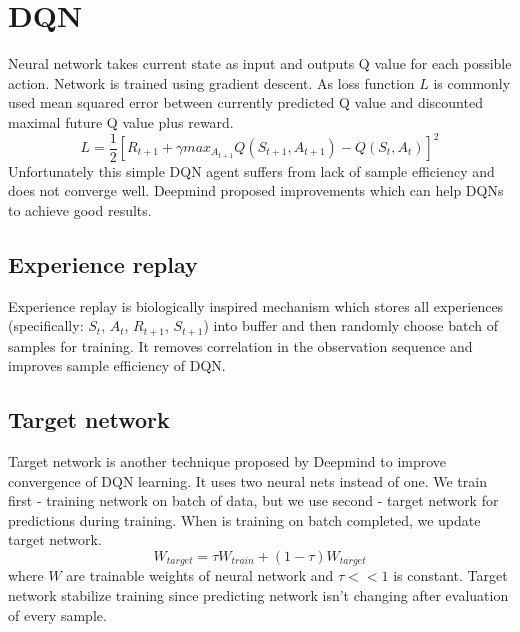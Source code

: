 \section{DQN}
Neural network takes current state as input and outputs Q value for each possible action. Network is trained using gradient descent. As loss function $L$ is commonly used mean squared error between currently predicted Q value and discounted maximal future Q value plus reward.
\begin{equation}
L = \frac{1}{2}[R_{t+1} + \gamma max_{A_{t+1}}Q(S_{t+1}, A_{t+1}) - Q(S_t, A_t)]^2
\end{equation}
Unfortunately this simple DQN agent suffers from lack of sample efficiency and does not converge well. Deepmind proposed improvements which can help DQNs to achieve good results.

\subsection{Experience replay}
Experience replay is biologically inspired mechanism which stores all experiences (specifically: $S_t$, $A_t$, $R_{t+1}$, $S_{t+1}$) into buffer and then randomly choose batch of samples for training. It removes correlation in the observation sequence and improves sample efficiency of DQN.

\subsection{Target network}
Target network is another technique proposed by Deepmind to improve convergence of DQN learning. It uses two neural nets instead of one. We train first - training network on batch of data, but we use second - target network for predictions during training. When is training on batch completed, we update target network.
\begin{equation}
W_{target} = \tau W_{train} + (1-\tau)W_{target}
\end{equation}
where $W$ are trainable weights of neural network and $\tau << 1$ is constant. Target network stabilize training since predicting network isn't changing after evaluation of every sample.
